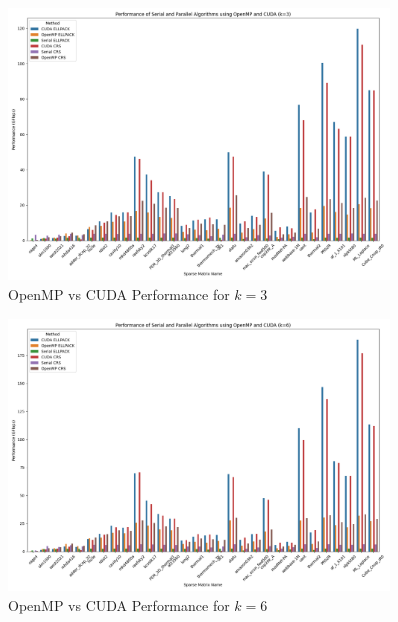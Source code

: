 \documentclass[12pt,oneside]{book} %
\begin{document}
\begin{figure}[H]
    \centering
    \includegraphics[width=0.9\textwidth]{../results/images/OpenMP_vs_CUDA_Performance_k3.png}
    \caption{OpenMP vs CUDA Performance for $k=3$}
    \label{fig:openmp-cuda-performance-k3}
\end{figure}

\begin{figure}[H]
    \centering
    \includegraphics[width=0.9\textwidth]{../results/images/OpenMP_vs_CUDA_Performance_k6.png}
    \caption{OpenMP vs CUDA Performance for $k=6$}
    \label{fig:openmp-cuda-performance-k6}
\end{figure}
\end{document}
